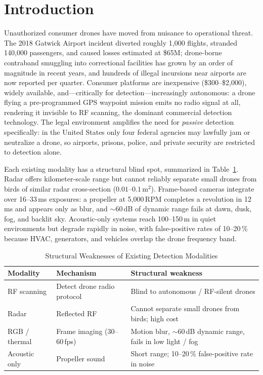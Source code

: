 \documentclass[conference]{IEEEtran}
\begin{document}
\section{Introduction}
Unauthorized consumer drones have moved from nuisance to operational
threat. The 2018 Gatwick Airport incident diverted roughly 1{,}000
flights, stranded 140{,}000 passengers, and caused losses estimated at
\$65M; drone-borne contraband smuggling into correctional facilities has
grown by an order of magnitude in recent years, and hundreds of illegal
incursions near airports are now reported per quarter. Consumer platforms
are inexpensive (\$300--\$2{,}000), widely available, and---critically
for detection---increasingly autonomous: a drone flying a pre-programmed
GPS waypoint mission emits no radio signal at all, rendering it invisible
to RF scanning, the dominant commercial detection technology. The legal
environment amplifies the need for \emph{passive} detection specifically:
in the United States only four federal agencies may lawfully jam or
neutralize a drone, so airports, prisons, police, and private security
are restricted to detection alone.

Each existing modality has a structural blind spot, summarized in
Table~\ref{tab:modalities}. Radar offers kilometer-scale range but cannot
reliably separate small drones from birds of similar radar cross-section
($0.01$--$0.1$\,m$^2$). Frame-based cameras integrate over
16--33\,ms exposures: a propeller at 5{,}000\,RPM completes a revolution
in 12\,ms and appears only as blur, and ${\sim}60$\,dB of dynamic range
fails at dawn, dusk, fog, and backlit sky. Acoustic-only systems reach
100--150\,m in quiet environments but degrade rapidly in noise, with
false-positive rates of 10--20\,\% because HVAC, generators, and vehicles
overlap the drone frequency band.

\begin{table}[t]
\caption{Structural Weaknesses of Existing Detection Modalities}
\label{tab:modalities}
\centering
\begin{tabular}{@{}p{1.5cm}p{2.6cm}p{3.2cm}@{}}
\toprule
\textbf{Modality} & \textbf{Mechanism} & \textbf{Structural weakness} \\
\midrule
RF scanning & Detect drone radio protocol & Blind to autonomous / RF-silent drones \\
Radar & Reflected RF & Cannot separate small drones from birds; high cost \\
RGB / thermal & Frame imaging (30--60\,fps) & Motion blur, ${\sim}60$\,dB dynamic range, fails in low light / fog \\
Acoustic only & Propeller sound & Short range; 10--20\,\% false-positive rate in noise \\
\bottomrule
\end{tabular}
\end{table}
\end{document}
